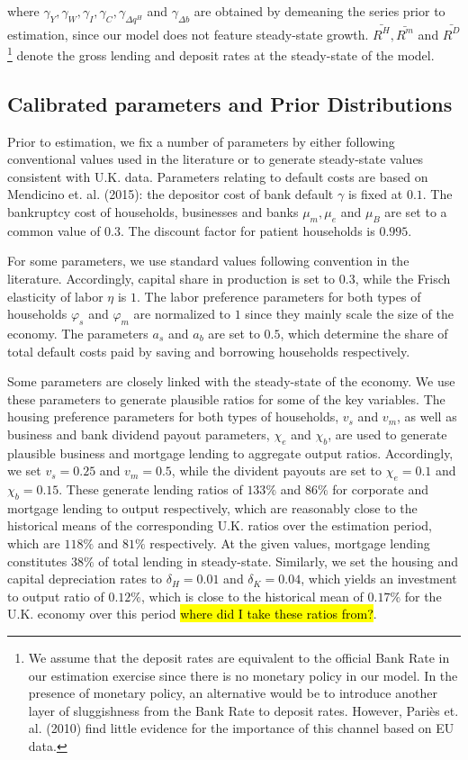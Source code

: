 \documentclass[12pt]{article}
\numberwithin{equation}{section}
\begin{document}
where $\gamma_Y,\gamma_W,\gamma_I,\gamma_C,\gamma_{\Delta q^H} $ and $\gamma_{\Delta b}$ are obtained by demeaning the series prior to estimation, since our model does not feature steady-state growth. $\bar{R^H}, \bar{R^m}$ and $\bar{R^D}$\footnote{We assume that the deposit rates are equivalent to the official Bank Rate in our estimation exercise since there is no monetary policy in our model. In the presence of monetary policy, an alternative would be to introduce another layer of sluggishness from the Bank Rate to deposit rates. However, Pariès et. al. (2010) find little evidence for the importance of this channel based on EU data.} denote the gross lending and deposit rates at the steady-state of the model.  

\subsection*{Calibrated parameters and Prior Distributions }

Prior to estimation, we fix a number of parameters by either following conventional values used in the literature or to generate steady-state values consistent with U.K. data. Parameters relating to default costs are based on Mendicino et. al. (2015): the depositor cost of bank default $\gamma$ is fixed at $0.1$. The bankruptcy cost of households, businesses and banks $\mu_m, \mu_e$ and $\mu_B$ are set to a common value of $0.3$. The discount factor for patient households is $0.995$. 


For some parameters, we use standard values following convention in the literature. Accordingly, capital share in production is set to $0.3$, while the Frisch elasticity of labor $\eta$ is $1$. The labor preference parameters for both types of households $\varphi_s$ and $\varphi_m$ are normalized to $1$ since they mainly scale the size of the economy. The parameters $a_s$ and $a_b$ are set to $0.5$, which determine the share of total default costs paid by saving and borrowing households respectively. 


Some parameters are closely linked with the steady-state of the economy. We use these parameters to generate plausible ratios for some of the key variables. The housing preference parameters for both types of households, $v_s$ and $v_m$, as well as business and bank dividend payout parameters, $\chi_e$ and $\chi_b$, are used to generate plausible business and mortgage lending to aggregate output ratios.  Accordingly, we set $v_s=0.25$ and $v_m=0.5$, while the divident payouts are set to $\chi_e=0.1$ and $\chi_b=0.15$. These generate lending ratios of $133 \%$ and $86 \%$ for corporate and mortgage lending to output respectively, which are reasonably close to the historical means of the corresponding U.K. ratios over the estimation period, which are $118 \%$ and $81 \%$ respectively. At the given values, mortgage lending constitutes $38 \%$ of total lending in steady-state. Similarly, we set the housing and capital depreciation rates to $\delta_H=0.01$ and $\delta_K=0.04$, which yields an investment to output ratio of $0.12 \%$, which is close to the historical mean of $0.17 \%$ for the U.K. economy over this period \hl{where did I take these ratios from?}. 
\end{document}
